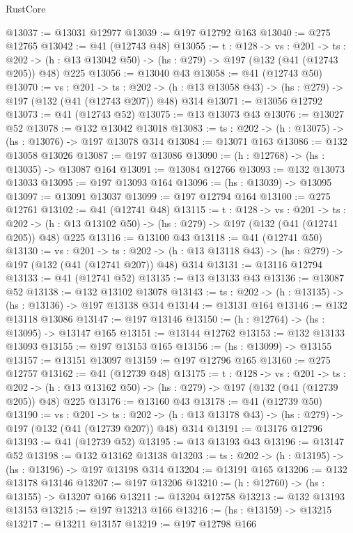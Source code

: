 \begin{lexlean}{RustCore}
\begin{coremodule}
@13037 := @13031 @12977
@13039 := @197 @12792 @163
@13040 := @275 @12765
@13042 := @41 (@12743 @48)
@13055 := {t : @128} ->
  {vs : @201} ->
  {ts : @202} -> (h : @13 @13042 @50) -> (hs : @279) -> @197 (@132 (@41 (@12743 @205)) @48) @225
@13056 := @13040 @43
@13058 := @41 (@12743 @50)
@13070 := {vs : @201} ->
  {ts : @202} -> (h : @13 @13058 @43) -> (hs : @279) -> @197 (@132 (@41 (@12743 @207)) @48) @314
@13071 := @13056 @12792
@13073 := @41 (@12743 @52)
@13075 := @13 @13073 @43
@13076 := @13027 @52
@13078 := @132 @13042 @13018
@13083 := {ts : @202} -> (h : @13075) -> (hs : @13076) -> @197 @13078 @314
@13084 := @13071 @163
@13086 := @132 @13058 @13026
@13087 := @197 @13086
@13090 := (h : @12768) -> (hs : @13035) -> @13087 @164
@13091 := @13084 @12766
@13093 := @132 @13073 @13033
@13095 := @197 @13093 @164
@13096 := (hs : @13039) -> @13095
@13097 := @13091 @13037
@13099 := @197 @12794 @164
@13100 := @275 @12761
@13102 := @41 (@12741 @48)
@13115 := {t : @128} ->
  {vs : @201} ->
  {ts : @202} -> (h : @13 @13102 @50) -> (hs : @279) -> @197 (@132 (@41 (@12741 @205)) @48) @225
@13116 := @13100 @43
@13118 := @41 (@12741 @50)
@13130 := {vs : @201} ->
  {ts : @202} -> (h : @13 @13118 @43) -> (hs : @279) -> @197 (@132 (@41 (@12741 @207)) @48) @314
@13131 := @13116 @12794
@13133 := @41 (@12741 @52)
@13135 := @13 @13133 @43
@13136 := @13087 @52
@13138 := @132 @13102 @13078
@13143 := {ts : @202} -> (h : @13135) -> (hs : @13136) -> @197 @13138 @314
@13144 := @13131 @164
@13146 := @132 @13118 @13086
@13147 := @197 @13146
@13150 := (h : @12764) -> (hs : @13095) -> @13147 @165
@13151 := @13144 @12762
@13153 := @132 @13133 @13093
@13155 := @197 @13153 @165
@13156 := (hs : @13099) -> @13155
@13157 := @13151 @13097
@13159 := @197 @12796 @165
@13160 := @275 @12757
@13162 := @41 (@12739 @48)
@13175 := {t : @128} ->
  {vs : @201} ->
  {ts : @202} -> (h : @13 @13162 @50) -> (hs : @279) -> @197 (@132 (@41 (@12739 @205)) @48) @225
@13176 := @13160 @43
@13178 := @41 (@12739 @50)
@13190 := {vs : @201} ->
  {ts : @202} -> (h : @13 @13178 @43) -> (hs : @279) -> @197 (@132 (@41 (@12739 @207)) @48) @314
@13191 := @13176 @12796
@13193 := @41 (@12739 @52)
@13195 := @13 @13193 @43
@13196 := @13147 @52
@13198 := @132 @13162 @13138
@13203 := {ts : @202} -> (h : @13195) -> (hs : @13196) -> @197 @13198 @314
@13204 := @13191 @165
@13206 := @132 @13178 @13146
@13207 := @197 @13206
@13210 := (h : @12760) -> (hs : @13155) -> @13207 @166
@13211 := @13204 @12758
@13213 := @132 @13193 @13153
@13215 := @197 @13213 @166
@13216 := (hs : @13159) -> @13215
@13217 := @13211 @13157
@13219 := @197 @12798 @166

\end{coremodule}
\end{lexlean}
